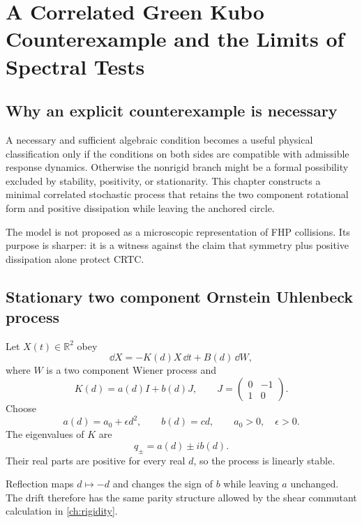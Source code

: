 \chapter{A Correlated Green Kubo Counterexample and the Limits of Spectral Tests}\label{ch:counterexample}

\section{Why an explicit counterexample is necessary}
A necessary and sufficient algebraic condition becomes a useful physical classification only if the conditions on both sides are compatible with admissible response dynamics. Otherwise the nonrigid branch might be a formal possibility excluded by stability, positivity, or stationarity. This chapter constructs a minimal correlated stochastic process that retains the two component rotational form and positive dissipation while leaving the anchored circle.

The model is not proposed as a microscopic representation of FHP collisions. Its purpose is sharper: it is a witness against the claim that symmetry plus positive dissipation alone protect CRTC.

\section{Stationary two component Ornstein Uhlenbeck process}
Let $X(t)\in\mathbb{R}^2$ obey
\begin{equation}
 \dd X=-K(d)X\,\dd t+B(d)\,\dd W,
 \label{eq:ou_sde}
\end{equation}
where $W$ is a two component Wiener process and
\begin{equation}
 K(d)=a(d)I+b(d)J,
 \qquad
 J=\begin{pmatrix}0&-1\\1&0\end{pmatrix}.
 \label{eq:ou_k}
\end{equation}
Choose
\begin{equation}
 a(d)=a_0+\epsilon d^2,
 \qquad
 b(d)=cd,
 \qquad
 a_0>0,
 \quad\epsilon>0.
 \label{eq:ou_functions}
\end{equation}
The eigenvalues of $K$ are
\begin{equation}
 q_\pm=a(d)\pm i b(d).
 \label{eq:ou_eigenvalues}
\end{equation}
Their real parts are positive for every real $d$, so the process is linearly stable.

Reflection maps $d\mapsto-d$ and changes the sign of $b$ while leaving $a$ unchanged. The drift therefore has the same parity structure allowed by the shear commutant calculation in \cref{ch:rigidity}.

